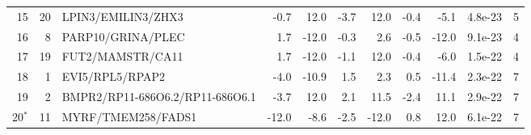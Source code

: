 \begin{table}[htbp]
\begin{tabular}{r r l rr rr rr r c}
15 & 20 & LPIN3/EMILIN3/ZHX3 & -0.7 & 12.0 & -3.7 & 12.0 & -0.4 & -5.1 & 4.8e-23 & 5\\
16 & 8 & PARP10/GRINA/PLEC & 1.7 & -12.0 & -0.3 & 2.6 & -0.5 & -12.0 & 9.1e-23 & 4\\
17 & 19 & FUT2/MAMSTR/CA11 & 1.7 & -12.0 & -1.1 & 12.0 & -0.4 & -6.0 & 1.5e-22 & 4\\
18 & 1 & EVI5/RPL5/RPAP2 & -4.0 & -10.9 & 1.5 & 2.3 & 0.5 & -11.4 & 2.3e-22 & 7\\
19 & 2 & BMPR2/RP11-686O6.2/RP11-686O6.1 & -3.7 & 12.0 & 2.1 & 11.5 & -2.4 & 11.1 & 2.9e-22 & 7\\
20$^{*}$ & 11 & MYRF/TMEM258/FADS1 & -12.0 & -8.6 & -2.5 & -12.0 & 0.8 & 12.0 & 6.1e-22 & 7\\
\bottomrule
\end{tabular}
\end{table}
